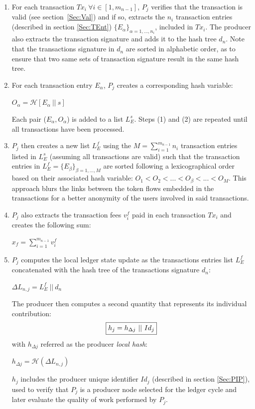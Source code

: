 \begin{enumerate}
\item For each transaction $Tx_i~\forall i\in [1,m_{n-1}]$, $P_j$ verifies that the transaction is valid (see section~\ref{Sec:Val}) and if so, extracts the $n_i$ transaction entries (described in section \ref{Sec:TEnt}) $\{E_\alpha\}_{\alpha=1,...,n_i}$, included in $Tx_i$. The producer also extracts the transaction signature and adds it to the hash tree $d_n$. Note that the transactions signature in $d_n$ are sorted in alphabetic order, as to ensure that two same sets of transaction signature result in the same hash tree.

\item For each transaction entry $E_\alpha$, $P_j$ creates a corresponding hash variable: 

\begin{center}
$O_\alpha = \mathcal{H}[E_\alpha~||~s]$
\end{center}

Each pair ($E_\alpha,O_\alpha$) is added to a list $L^s_E$. Steps (1) and (2) are repeated until all transactions have been processed.

\item	$P_j$ then creates a new list $L^f_E$ using the $M=\sum_{i=1}^{m_{n-1}}n_i$ transaction entries listed in $L^s_E$ (assuming all transactions are valid) such that the transaction entries in $L^f_E = \{E_\beta\}_{\beta=1,...,M}$ are sorted following a lexicographical order based on their associated hash variable: $O_1 < O_2 < ... < O_\beta < ... < O_M$. This approach blurs the links between the token flows embedded in the transactions for a better anonymity of the users involved in said transactions.

\item $P_j$ also extracts the transaction fees $v^{f}_i$ paid in each transaction $Tx_i$ and creates the following sum:
\begin{center}
$x_f = \sum_{i=1}^{m_{n-1}} v^{f}_i$
\end{center}

\item $P_j$ computes the local ledger state update as the transactions entries list $L^f_E$ concatenated with the hash tree of the transactions signature $d_n$: 
\begin{center}
$\Delta L_{n,j} = L^f_E~||~d_n $ %
\end{center}

The producer then computes a second quantity that represents its individual contribution:
\begin{equation}
\label{eq:hj}
\fbox{$h_j = h_{\Delta j}~||~Id_j$}
\end{equation}
with $h_{\Delta j}$ referred as the producer \textit{local hash}:  
\begin{center}
$h_{\Delta j} = \mathcal{H}(\Delta L_{n,j})$ 
\end{center}
$h_j$ includes the producer unique identifier $Id_j$ (described in section \ref{Sec:PIP}), used to verify that $P_j$ is a producer node selected for the ledger cycle and later evaluate the quality of work performed by $P_j$. 


\end{enumerate}
